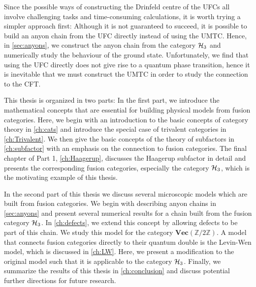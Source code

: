 Since the possible ways of constructing the Drinfeld centre of the UFCs all involve challenging tasks and time-consuming calculations, it is worth trying a simpler approach first: Although it is not guaranteed to succeed, it is possible to build an anyon chain from the UFC directly instead of using the UMTC. Hence, in \cref{sec:anyons}, we construct the anyon chain from the category ${\mathcal{H}_3}$ and numerically study the behaviour of the ground state. Unfortunately, we find that using the UFC directly does not give rise to a quantum phase transition, hence it is inevitable that we must construct the UMTC in order to study the connection to the CFT.

This thesis is organized in two parts: In the first part, we introduce the mathematical concepts that are essential for building physical models from fusion categories. Here, we begin with an introduction to the basic concepts of category theory in \cref{ch:cats} and introduce the special case of trivalent categories in \cref{ch:Trivalent}. We then give the basic concepts of the theory of subfactors in \cref{ch:subfactor} with an emphasis on the connection to fusion categories. The final chapter of Part 1, \cref{ch:Haagerup}, discusses the Haagerup subfactor in detail and presents the corresponding fusion categories, especially the category ${\mathcal{H}_3}$, which is the motivating example of this thesis.

In the second part of this thesis we discuss several microscopic models which are built from fusion categories. We begin with describing anyon chains in \cref{sec:anyons} and present several numerical results for a chain built from the fusion category ${\mathcal{H}_3}$. In \cref{ch:defects}, we extend this concept by allowing defects to be part of this chain. We study this model for the category $\mathbf{Vec}(\mathbb{Z}/2\mathbb{Z})$. A model that connects fusion categories directly to their quantum double is the Levin-Wen model, which is discussed in \cref{ch:LW}. Here, we present a modification to the original model such that it is applicable to the category ${\mathcal{H}_3}$. Finally, we summarize the results of this thesis in \cref{ch:conclusion} and discuss potential further directions for future research.